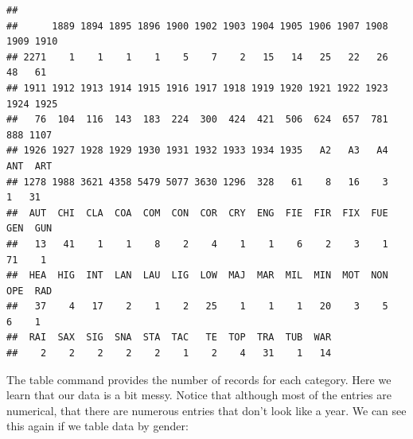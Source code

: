 \documentclass[]{book}
\newenvironment{Shaded}{\begin{snugshade}}{\end{snugshade}}
\newcommand{\KeywordTok}[1]{\textcolor[rgb]{0.13,0.29,0.53}{\textbf{{#1}}}}
\newcommand{\NormalTok}[1]{{#1}}
\begin{document}
\begin{verbatim}
## 
##      1889 1894 1895 1896 1900 1902 1903 1904 1905 1906 1907 1908 1909 1910 
## 2271    1    1    1    1    5    7    2   15   14   25   22   26   48   61 
## 1911 1912 1913 1914 1915 1916 1917 1918 1919 1920 1921 1922 1923 1924 1925 
##   76  104  116  143  183  224  300  424  421  506  624  657  781  888 1107 
## 1926 1927 1928 1929 1930 1931 1932 1933 1934 1935   A2   A3   A4  ANT  ART 
## 1278 1988 3621 4358 5479 5077 3630 1296  328   61    8   16    3    1   31 
##  AUT  CHI  CLA  COA  COM  CON  COR  CRY  ENG  FIE  FIR  FIX  FUE  GEN  GUN 
##   13   41    1    1    8    2    4    1    1    6    2    3    1   71    1 
##  HEA  HIG  INT  LAN  LAU  LIG  LOW  MAJ  MAR  MIL  MIN  MOT  NON  OPE  RAD 
##   37    4   17    2    1    2   25    1    1    1   20    3    5    6    1 
##  RAI  SAX  SIG  SNA  STA  TAC   TE  TOP  TRA  TUB  WAR 
##    2    2    2    2    2    1    2    4   31    1   14
\end{verbatim}

The table command provides the number of records for each category. Here
we learn that our data is a bit messy. Notice that although most of the
entries are numerical, that there are numerous entries that don't look
like a year. We can see this again if we table data by gender:

\begin{Shaded}
\end{Shaded}
\end{document}
